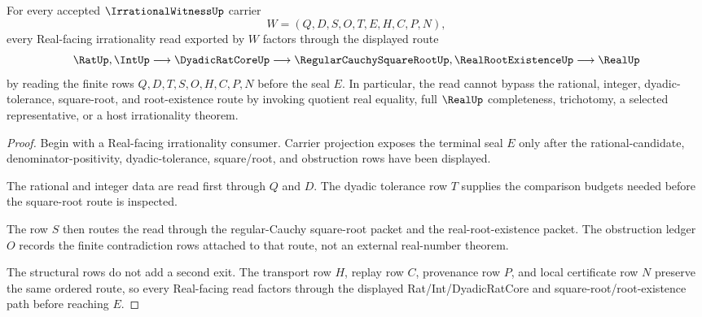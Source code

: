 \begin{theorem}
\label{thm:irrational-witness-square-root-handoff}
For every accepted $\IrrationalWitnessUp$ carrier
$$
W=(Q,D,S,O,T,E,H,C,P,N),
$$
every Real-facing irrationality read exported by $W$ factors through the displayed route
$$
\RatUp,\IntUp \longrightarrow \DyadicRatCoreUp \longrightarrow \RegularCauchySquareRootUp,\RealRootExistenceUp \longrightarrow \RealUp
$$
by reading the finite rows $Q,D,T,S,O,H,C,P,N$ before the seal $E$. In particular, the read cannot bypass the rational, integer, dyadic-tolerance, square-root, and root-existence route by invoking quotient real equality, full $\RealUp$ completeness, trichotomy, a selected representative, or a host irrationality theorem.
\end{theorem}
\begin{proof}
Begin with a Real-facing irrationality consumer. Carrier projection exposes the terminal seal $E$ only after the rational-candidate, denominator-positivity, dyadic-tolerance, square/root, and obstruction rows have been displayed.

The rational and integer data are read first through $Q$ and $D$. The dyadic tolerance row $T$ supplies the comparison budgets needed before the square-root route is inspected.

The row $S$ then routes the read through the regular-Cauchy square-root packet and the real-root-existence packet. The obstruction ledger $O$ records the finite contradiction rows attached to that route, not an external real-number theorem.

The structural rows do not add a second exit. The transport row $H$, replay row $C$, provenance row $P$, and local certificate row $N$ preserve the same ordered route, so every Real-facing read factors through the displayed Rat/Int/DyadicRatCore and square-root/root-existence path before reaching $E$.
\end{proof}

